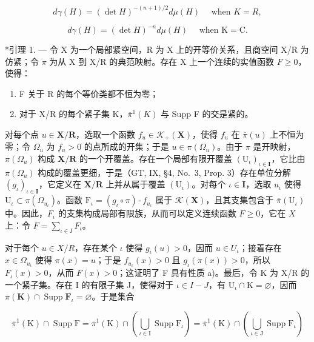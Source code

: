 \[
d \gamma (H) = (\det H) ^ {- (n + 1) / 2} d \mu (H) \quad \text { when } K = R,
\]

\[
d \gamma (H) = (\det H) ^ {- n} d \mu (H) \quad \text { when } \mathrm{K} = \mathrm{C}.
\]

\appendixheading

*引理 1. --- 令 X 为一个局部紧空间，R 为 X 上的开等价关系，且商空间 X/R 为仿紧；令 \(\pi\) 为从 X 到 X/R 的典范映射。存在 X 上一个连续的实值函数 \(F \geqslant 0\)，使得：

\begin{enumerate}
\def\labelenumi{\alph{enumi})}
\item
  F 关于 R 的每个等价类都不恒为零；
\item
  对于 X/R 的每个紧子集 K，\(\overline{\pi}^{1}(K)\) 与 Supp F 的交是紧的。
\end{enumerate}

对每个点 \(u \in \mathbf{X} / \mathbf{R}\)，选取一个函数 \(f_{u} \in \mathcal{K}_{+}(\mathbf{X})\)，使得 \(f_{u}\) 在 \(\overline{\pi}(u)\) 上不恒为零；令 \(\Omega_{u}\) 为 \(f_{u} > 0\) 的点所成的开集；于是 \(u \in \pi(\Omega_{u})\)。由于 \(\pi\) 是开映射，\(\pi(\Omega_{u})\) 构成 \(\mathbf{X} / \mathbf{R}\) 的一个开覆盖。存在一个局部有限开覆盖 \((\mathrm{U}_{\iota})_{\iota \in \mathbf{I}}\)，它比由 \(\pi(\Omega_{u})\) 构成的覆盖更细，于是（GT, IX, §4, No.~3, Prop. 3）存在单位分解 \((g_{\iota})_{\iota \in \mathbf{I}}\)，它定义在 \(\mathbf{X} / \mathbf{R}\) 上并从属于覆盖 \((\mathrm{U}_{\iota})\)。对每个 \(\iota \in \mathbf{I}\)，选取 \(u_{\iota}\) 使得 \(\mathrm{U}_{\iota} \subset \pi(\Omega_{u_{\iota}})\)。函数 \(\mathrm{F}_{\iota} = (g_{\iota} \circ \pi) \cdot f_{u_{\iota}}\) 属于 \(\mathcal{K}(\mathbf{X})\)，且其支集包含于 \(\overline{\pi}(\mathrm{U}_{\iota})\) 中。因此，\(F_{\iota}\) 的支集构成局部有限族，从而可以定义连续函数 \(F \geqslant 0\)，它在 \(X\) 上：令 \(F = \sum_{\iota \in I} F_{\iota}\)。

对于每个 \(u \in X/R\)，存在某个 \(\iota\) 使得 \(g_{\iota}(u) > 0\)，因而 \(u \in U_{\iota}\)；接着存在 \(x \in \Omega_{u_{\iota}}\) 使得 \(\pi(x) = u\)；于是 \(f_{u_{\iota}}(x) > 0\) 且 \(g_{\iota}(\pi(x)) > 0\)，所以 \(F_{\iota}(x) > 0\)，从而 \(F(x) > 0\)；这证明了 F 具有性质 a)。最后，令 K 为 X/R 的一个紧子集。存在 I 的有限子集 J，使得对于 \(\iota \in I - J\)，有 \(\mathrm{U}_{\iota}\cap \mathrm{K} = \varnothing\)，因而 \(\overline{\pi} (\mathbf{K})\cap \operatorname {Supp}\mathbf{F}_{\iota} = \varnothing\)。于是集合

\[
\overline {{\pi}} ^ {1} (\mathrm{K}) \cap \operatorname{Supp} \mathrm{F} = \overline {{\pi}} ^ {1} (\mathrm{K}) \cap \left(\bigcup_ {\iota \in \mathrm{I}} \operatorname{Supp} \mathrm{F} _ {\iota}\right) = \overline {{\pi}} ^ {1} (\mathrm{K}) \cap \left(\bigcup_ {\iota \in \mathrm{J}} \operatorname{Supp} \mathrm{F} _ {\iota}\right)
\]

